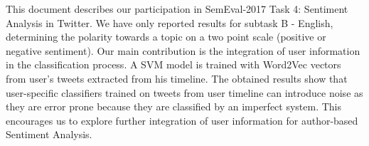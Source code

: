 This document describes our participation in SemEval-2017 Task 4: Sentiment Analysis in Twitter. We have only reported results for subtask B - English, determining the polarity towards a topic on a two point scale (positive or negative sentiment). Our main contribution is the integration of user information in the classification process. A SVM model is trained with Word2Vec vectors from user's tweets extracted from his timeline. The obtained results show that user-specific classifiers trained on tweets from user timeline can introduce noise as they are error prone because they are classified by an imperfect system. This encourages us to explore further integration of user information for author-based Sentiment Analysis.

